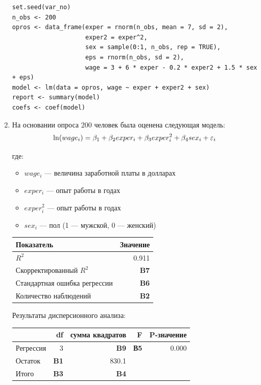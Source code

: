 \documentclass[12pt, a4paper]{article}
\begin{document}
\begin{enumerate}

\begin{verbatim}
set.seed(var_no)
n_obs <- 200
opros <- data_frame(exper = rnorm(n_obs, mean = 7, sd = 2),
                    exper2 = exper^2,
                    sex = sample(0:1, n_obs, rep = TRUE),
                    eps = rnorm(n_obs, sd = 2),
                    wage = 3 + 6 * exper - 0.2 * exper2 + 1.5 * sex + eps)
model <- lm(data = opros, wage ~ exper + exper2 + sex)
report <- summary(model)
coefs <- coef(model)
\end{verbatim}

\item На основании опроса 200 человек была оценена следующая модель:
\[
\ln(wage_i)=\beta_1 + \beta_2 exper_i + \beta_3 exper^2_i + \beta_4 sex_i + \varepsilon_i
\]

где:
\begin{itemize}
\item $wage_i$ — величина заработной платы в долларах
\item $exper_i$ — опыт работы в годах
\item $exper^2_i$ — опыт работы в годах
\item $sex_i$ — пол (1 — мужской, 0 — женский)
\end{itemize}

\begin{tabular}{lr} \toprule
Показатель & Значение \\
\midrule
$R^2$                        & 0.911 \\
Скорректированный $R^2$      & \textbf{B7} \\
Стандартная ошибка регрессии & \textbf{B6} \\
Количество наблюдений        & \textbf{B2} \\
\bottomrule
\end{tabular}

Результаты дисперсионного анализа:

\begin{tabular}{lrrrr} \toprule
            &  df           & сумма квадратов & F           & P-значение \\
\midrule
Регрессия   & 3            & \textbf{B9}     & \textbf{В5}  & 0.000 \\
Остаток     & \textbf{B1}  &  830.1          &              &       \\
Итого       & \textbf{B3}  & \textbf{B4}     &              &       \\
\bottomrule
\end{tabular}



\end{enumerate}
\end{document}
